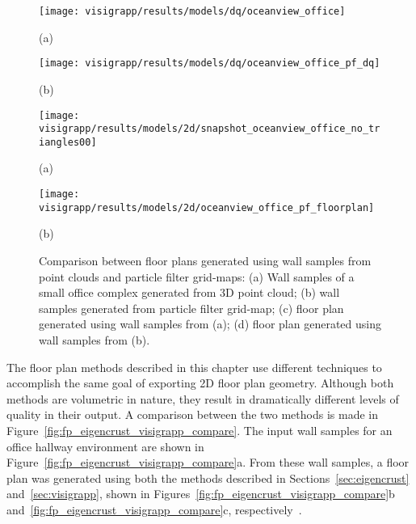 \documentclass[12pt,onecolumn,oneside]{book}
\begin{document}
\begin{figure}

	\centering
	\begin{minipage}[b]{0.45\linewidth}
	\centerline{\texttt{[image: visigrapp/results/models/dq/oceanview\_office]}}
	\centerline{(a)}
	\end{minipage}
	\hfill
	\begin{minipage}[b]{0.45\linewidth}
	\centerline{\texttt{[image: visigrapp/results/models/dq/oceanview\_office\_pf\_dq]}}
	\centerline{(b)}
	\end{minipage}

	\centering
	\begin{minipage}[b]{0.45\linewidth}
	\centerline{\texttt{[image: visigrapp/results/models/2d/snapshot\_oceanview\_office\_no\_triangles00]}}
	\centerline{(a)}
	\end{minipage}
	\hfill
	\begin{minipage}[b]{0.45\linewidth}
	\centerline{\texttt{[image: visigrapp/results/models/2d/oceanview\_office\_pf\_floorplan]}}
	\centerline{(b)}
	\end{minipage}

	\caption[Comparison between floor plans generated from point clouds and grid-maps.]{Comparison between floor plans generated using wall samples from point clouds and particle filter grid-maps:  (a) Wall samples of a small office complex generated from 3D point cloud; (b) wall samples generated from particle filter grid-map; (c) floor plan generated using wall samples from (a); (d) floor plan generated using wall samples from (b).}
	\label{fig:pf_pc_compare}

\end{figure}

The floor plan methods described in this chapter use different techniques to accomplish the same goal of exporting 2D floor plan geometry.  Although both methods are volumetric in nature, they result in dramatically different levels of quality in their output.  A comparison between the two methods is made in Figure~\ref{fig:fp_eigencrust_visigrapp_compare}.  The input wall samples for an office hallway environment are shown in Figure~\ref{fig:fp_eigencrust_visigrapp_compare}a.  From these wall samples, a floor plan was generated using both the methods described in Sections~\ref{sec:eigencrust} and~\ref{sec:visigrapp}, shown in Figures~\ref{fig:fp_eigencrust_visigrapp_compare}b and~\ref{fig:fp_eigencrust_visigrapp_compare}c, respectively~\cite{Turner12,Turner14}.
\end{document}
